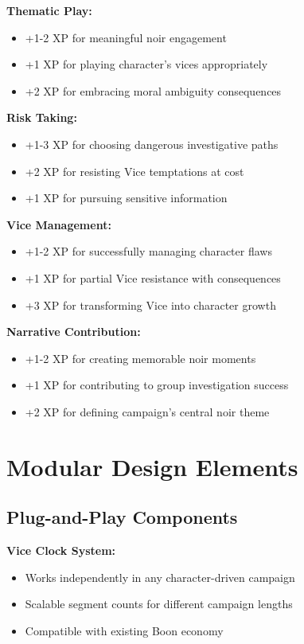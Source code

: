 \documentclass[11pt]{article}
\begin{document}
\textbf{Thematic Play:}
\begin{itemize}
\item +1-2 XP for meaningful noir engagement
\item +1 XP for playing character's vices appropriately
\item +2 XP for embracing moral ambiguity consequences
\end{itemize}

\textbf{Risk Taking:}
\begin{itemize}
\item +1-3 XP for choosing dangerous investigative paths
\item +2 XP for resisting Vice temptations at cost
\item +1 XP for pursuing sensitive information
\end{itemize}

\textbf{Vice Management:}
\begin{itemize}
\item +1-2 XP for successfully managing character flaws
\item +1 XP for partial Vice resistance with consequences
\item +3 XP for transforming Vice into character growth
\end{itemize}

\textbf{Narrative Contribution:}
\begin{itemize}
\item +1-2 XP for creating memorable noir moments
\item +1 XP for contributing to group investigation success
\item +2 XP for defining campaign's central noir theme
\end{itemize}

\section{Modular Design Elements}

\subsection{Plug-and-Play Components}

\textbf{Vice Clock System:}
\begin{itemize}
\item Works independently in any character-driven campaign
\item Scalable segment counts for different campaign lengths
\item Compatible with existing Boon economy
\end{itemize}
\end{document}
